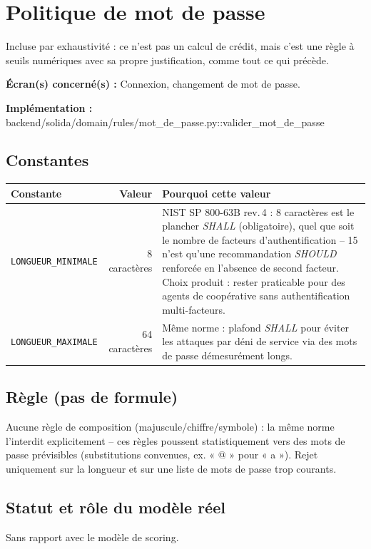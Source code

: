 \documentclass[11pt,a4paper]{article}
\newcommand{\brk}{\allowbreak}
\newcommand{\ecran}[1]{\noindent\textbf{Écran(s) concerné(s) :} #1\par}
\newcommand{\fichier}[1]{\noindent\textbf{Implémentation :} \tiny\ttfamily#1\normalfont\normalsize\par}
\begin{document}
\newpage

\section{Politique de mot de passe}
\label{sec:motdepasse}

Incluse par exhaustivité : ce n'est pas un calcul de crédit, mais c'est une règle à seuils
numériques avec sa propre justification, comme tout ce qui précède.

\ecran{Connexion, changement de mot de passe.}
\fichier{backend/\brk solida/\brk domain/\brk rules/\brk mot\_de\_passe.py::\brk{}valider\_mot\_de\_passe}

\subsection*{Constantes}

\begin{tabular}{@{}L{3.2cm}rL{6.9cm}@{}}
\toprule
Constante & Valeur & Pourquoi cette valeur \\
\midrule
\texttt{LONGUEUR\_\brk{}MINIMALE} & 8 caractères & NIST SP 800-63B rev.\,4 : 8 caractères est le
  plancher \emph{SHALL} (obligatoire), quel que soit le nombre de facteurs d'authentification --
  15 n'est qu'une recommandation \emph{SHOULD} renforcée en l'absence de second facteur. Choix
  produit : rester praticable pour des agents de coopérative sans authentification
  multi-facteurs. \\
\texttt{LONGUEUR\_\brk{}MAXIMALE} & 64 caractères & Même norme : plafond \emph{SHALL} pour éviter les
  attaques par déni de service via des mots de passe démesurément longs. \\
\bottomrule
\end{tabular}

\subsection*{Règle (pas de formule)}
Aucune règle de composition (majuscule/chiffre/symbole) : la même norme l'interdit explicitement
-- ces règles poussent statistiquement vers des mots de passe prévisibles (substitutions
convenues, ex. « @ » pour « a »). Rejet uniquement sur la longueur et sur une liste de mots de
passe trop courants.

\subsection*{Statut et rôle du modèle réel}
Sans rapport avec le modèle de scoring.
\end{document}

